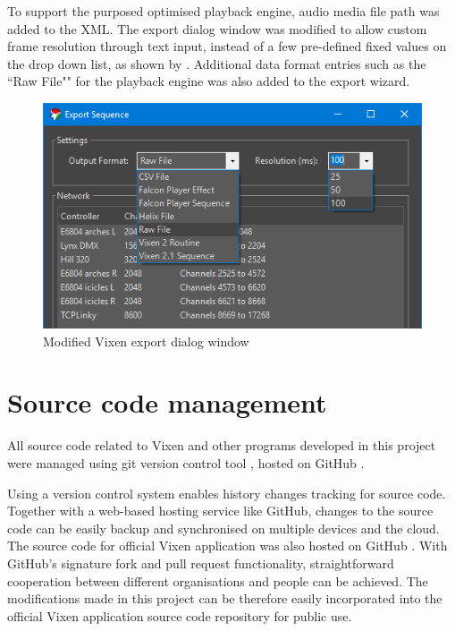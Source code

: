 To support the purposed optimised playback engine, audio media file path was added to the XML. The export dialog window was modified to allow custom frame resolution through text input, instead of a few pre-defined fixed values on the drop down list, as shown by . Additional data format entries such as the ``Raw File"" for the playback engine was also added to the export wizard. 

\begin{figure}[t]
  \centering
  \includegraphics[width=0.75\columnwidth]{Figs/vixen_export.png}
  \caption{Modified Vixen export dialog window}
  \label{fig:vixen_export}
\end{figure}

\section{Source code management}

All source code related to Vixen and other programs developed in this project were managed using git version control tool \cite{git}, hosted on GitHub \cite{github} \cite{github_vixen_yz} \cite{github_project}.

Using a version control system enables history changes tracking for source code. Together with a web-based hosting service like GitHub, changes to the source code can be easily backup and synchronised on multiple devices and the cloud. The source code for official Vixen application was also hosted on GitHub \cite{github_vixen}. With GitHub's signature fork and pull request functionality, straightforward cooperation between different organisations and people can be achieved. The modifications made in this project can be therefore easily incorporated into the official Vixen application source code repository for public use.
